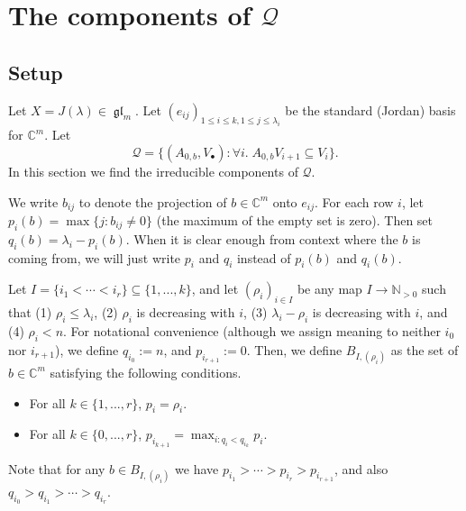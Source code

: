 \documentclass[12pt,psamsfonts]{article}
\DeclareMathOperator{\gl}{\mathfrak{gl}}
\begin{document}
\section{The components of \texorpdfstring{\(\mathcal{Q}\)}{Q}}\label{q_comp}
\subsection{Setup}
Let \(X = J(\lambda) \in \gl_m\).
Let \((e_{ij})_{1 \leq i \leq k, 1 \leq j \leq \lambda_i}\) be the standard (Jordan) basis for \(\mathbb{C}^m\).
Let
\[\mathcal{Q} = \{(A_{0,b}, V_\bullet) : \forall i. \; A_{0,b} V_{i + 1} \subseteq V_i\}.\]
In this section we find the irreducible components of \(\mathcal{Q}\).
\par We write \(b_{ij}\) to denote the projection of \(b \in \mathbb{C}^m\) onto \(e_{ij}\).
For each row \(i\), let \(p_i(b) = \max\{j : b_{ij} \neq 0\}\) (the maximum of the empty set is zero).
Then set \(q_i(b) = \lambda_i - p_i(b)\).
When it is clear enough from context where the \(b\) is coming from, we will just write \(p_i\) and \(q_i\) instead of \(p_i(b)\) and \(q_i(b)\).
\par Let \(I = \{i_1 < \cdots < i_r\} \subseteq \{1, ..., k\}\), and let \((\rho_i)_{i \in I}\) be any map \(I \to \mathbb{N}_{> 0}\) such that (1) \(\rho_i \leq \lambda_i\), (2) \(\rho_i\) is decreasing with \(i\), (3) \(\lambda_i - \rho_i\) is decreasing with \(i\), and (4) \(\rho_i < n\).
For notational convenience (although we assign meaning to neither \(i_0\) nor \(i_{r + 1}\)), we define \(q_{i_0} := n\), and \(p_{i_{r + 1}} := 0\).
Then, we define \(B_{I, (\rho_i)}\) as the set of \(b \in \mathbb{C}^m\) satisfying the following conditions.
\begin{itemize}
    \item For all \(k \in \{1, ..., r\}\), \(p_i = \rho_i\).
    \item For all \(k \in \{0, ..., r\}\), \(p_{i_{k + 1}} = \max_{i : q_i < q_{i_k}} p_i\).
\end{itemize}
Note that for any \(b \in B_{I, (\rho_i)}\) we have \(p_{i_1} > \cdots > p_{i_r} > p_{i_{r + 1}}\), and also \(q_{i_0} > q_{i_1} > \cdots > q_{i_r}\).
\end{document}
